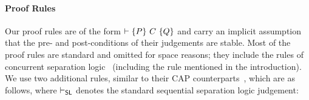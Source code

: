 \paragraph{Proof Rules}
Our proof rules are of the form $\entails \{P\}\ C\ \{Q\}$ and carry
an implicit assumption that the pre- and post-conditions of their
judgements are stable. Most of the proof rules are standard and
omitted for space reasons; they include the rules of concurrent
separation logic~\cite{csl-tcs} (including the 
rule mentioned in the introduction). We use two additional rules,
similar to their CAP counterparts~\cite{cap-ecoop10}, which are as
follows, where $\entails_{\textsf{SL}}$ denotes the standard
sequential separation logic judgement:
\begin{mathpar}

\end{mathpar}
%
%
